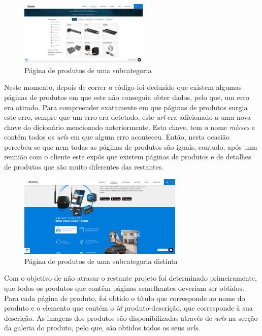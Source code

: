 \begin{figure}[htb]
    \centering
    
    \includegraphics[width=0.55\textwidth]{images/implementacao/scraper/pagina_produtos_subcat.png}
    \caption{Página de produtos de uma subcategoria}
    \label{fig:51}
\end{figure}

\newpage
Neste momento, depois de correr o código foi deduzido que existem algumas páginas de produtos em que este não conseguia obter dados, pelo que, um erro era atirado. Para compreender exatamente em que páginas de produtos surgia este erro, sempre que um erro era detetado, este \textit{url} era adicionado a uma nova chave do dicionário mencionado anteriormente. Esta chave, tem o nome \textit{misses} e contém todos os \textit{urls} em que algum erro aconteceu. Então, nesta ocasião percebeu-se que nem todas as páginas de produtos são iguais, contudo, após uma reunião com o cliente este expôs que existem páginas de produtos e de detalhes de produtos que são muito diferentes das restantes.

\begin{figure}[htb]
    \centering
    
    \includegraphics[width=0.7\textwidth]{images/implementacao/scraper/mconnect.png}
    \caption{Página de produtos de uma subcategoria distinta}
    \label{fig:52}
\end{figure}

Com o objetivo de não atrasar o restante projeto foi determinado primeiramente, que todos os produtos que contêm páginas semelhantes deveriam ser obtidos. Para cada página de produto, foi obtido o título que corresponde ao nome do produto e o elemento que contém o \textit{id} produto-descrição, que corresponde à sua descrição. As imagens dos produtos são disponibilizadas através de \textit{urls} na secção da galeria do produto, pelo que, são obtidos todos os seus \textit{urls}.


